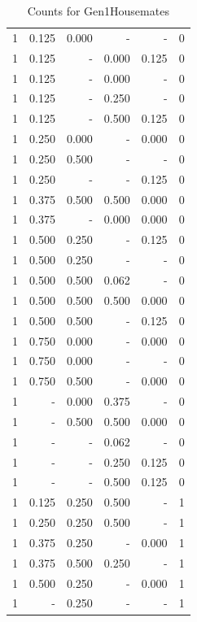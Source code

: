 \documentclass[a4paper]{article}\usepackage{graphicx, color}
\begin{document}
\begin{table}[ht]
\begin{tabular}{rrrrrr}
  1 & 0.125 & 0.000 & - & - & 0 \\ 
   \rowcolor{sosoColor} 1 & 0.125 & - & 0.000 & 0.125 & 0 \\ 
   \rowcolor{sosoColor} 1 & 0.125 & - & 0.000 & - & 0 \\ 
   \rowcolor{sosoColor} 1 & 0.125 & - & 0.250 & - & 0 \\ 
   \rowcolor{sosoColor} 1 & 0.125 & - & 0.500 & 0.125 & 0 \\ 
  1 & 0.250 & 0.000 & - & 0.000 & 0 \\ 
  1 & 0.250 & 0.500 & - & - & 0 \\ 
   \rowcolor{nullColor} 1 & 0.250 & - & - & 0.125 & 0 \\ 
   \rowcolor{goodColor} 1 & 0.375 & 0.500 & 0.500 & 0.000 & 0 \\ 
   \rowcolor{sosoColor} 1 & 0.375 & - & 0.000 & 0.000 & 0 \\ 
  1 & 0.500 & 0.250 & - & 0.125 & 0 \\ 
  1 & 0.500 & 0.250 & - & - & 0 \\ 
   \rowcolor{badColor} 1 & 0.500 & 0.500 & 0.062 & - & 0 \\ 
   \rowcolor{goodColor} 1 & 0.500 & 0.500 & 0.500 & 0.000 & 0 \\ 
  1 & 0.500 & 0.500 & - & 0.125 & 0 \\ 
  1 & 0.750 & 0.000 & - & 0.000 & 0 \\ 
  1 & 0.750 & 0.000 & - & - & 0 \\ 
  1 & 0.750 & 0.500 & - & 0.000 & 0 \\ 
   \rowcolor{badColor} 1 & - & 0.000 & 0.375 & - & 0 \\ 
   \rowcolor{goodColor} 1 & - & 0.500 & 0.500 & 0.000 & 0 \\ 
   \rowcolor{sosoColor} 1 & - & - & 0.062 & - & 0 \\ 
   \rowcolor{sosoColor} 1 & - & - & 0.250 & 0.125 & 0 \\ 
   \rowcolor{sosoColor} 1 & - & - & 0.500 & 0.125 & 0 \\ 
   \rowcolor{badColor} 1 & 0.125 & 0.250 & 0.500 & - & 1 \\ 
   \rowcolor{badColor} 1 & 0.250 & 0.250 & 0.500 & - & 1 \\ 
  1 & 0.375 & 0.250 & - & 0.000 & 1 \\ 
   \rowcolor{badColor} 1 & 0.375 & 0.500 & 0.250 & - & 1 \\ 
  1 & 0.500 & 0.250 & - & 0.000 & 1 \\ 
  1 & - & 0.250 & - & - & 1 \\ 
   \hline
\end{tabular}
\caption{Counts for Gen1Housemates} 
\end{table}
\end{document}
